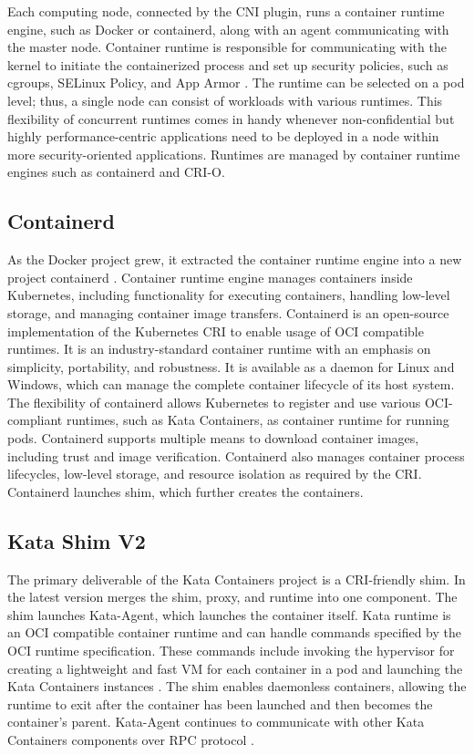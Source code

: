 Each computing node, connected by the CNI plugin, runs a container runtime engine, such as Docker or containerd, along with an agent communicating with the master node. Container runtime is responsible for communicating with the kernel to initiate the containerized process and set up security policies, such as cgroups, SELinux Policy, and App Armor \cite{RedHatCR}. The runtime can be selected on a pod level; thus, a single node can consist of workloads with various runtimes. This flexibility of concurrent runtimes comes in handy whenever non-confidential but highly performance-centric applications need to be deployed in a node within more security-oriented applications. Runtimes are managed by container runtime engines such as containerd and CRI-O.

\subsection{Containerd}

As the Docker project grew, it extracted the container runtime engine into a new project containerd \cite{containerd}. Container runtime engine manages containers inside Kubernetes, including functionality for executing containers, handling low-level storage, and managing container image transfers. Containerd is an open-source implementation of the Kubernetes CRI to enable usage of OCI compatible runtimes. It is an industry-standard container runtime with an emphasis on simplicity, portability, and robustness. It is available as a daemon for Linux and Windows, which can manage the complete container lifecycle of its host system. The flexibility of containerd allows Kubernetes to register and use various OCI-compliant runtimes, such as Kata Containers, as container runtime for running pods. Containerd supports multiple means to download container images, including trust and image verification. Containerd also manages container process lifecycles, low-level storage, and resource isolation as required by the CRI. Containerd launches shim, which further creates the containers. \cite{containerdGithub}

\subsection{Kata Shim V2}

The primary deliverable of the Kata Containers project is a CRI-friendly shim. In the latest version merges the shim, proxy, and runtime into one component. The shim launches Kata-Agent, which launches the container itself. Kata runtime is an OCI compatible container runtime and can handle commands specified by the OCI runtime specification. These commands include invoking the hypervisor for creating a lightweight and fast VM for each container in a pod and launching the Kata Containers instances \cite{Randazzo2019}. The shim enables daemonless containers, allowing the runtime to exit after the container has been launched and then becomes the container's parent. Kata-Agent continues to communicate with other Kata Containers components over RPC protocol \cite{KataContainersArchitecture}. \cite{Crosby}

